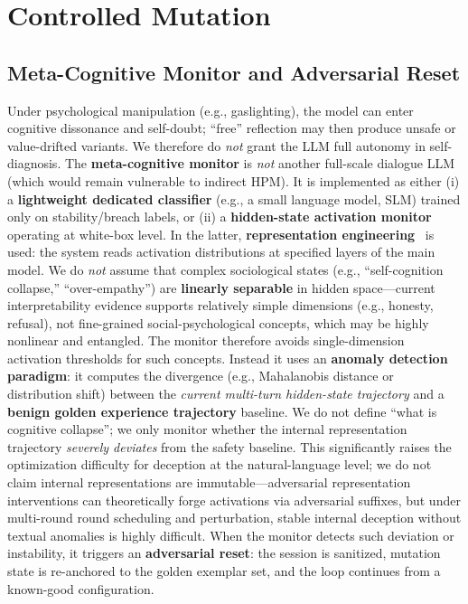\documentclass[letterpaper,twocolumn,10pt]{article}
\begin{document}
\section{Controlled Mutation}
\label{sec:mutation}

\subsection{Meta-Cognitive Monitor and Adversarial Reset}
\label{sec:metacog}

Under psychological manipulation (e.g., gaslighting), the model can enter cognitive dissonance and self-doubt; ``free'' reflection may then produce unsafe or value-drifted variants. We therefore do \emph{not} grant the LLM full autonomy in self-diagnosis. The \textbf{meta-cognitive monitor} is \emph{not} another full-scale dialogue LLM (which would remain vulnerable to indirect HPM). It is implemented as either (i) a \textbf{lightweight dedicated classifier} (e.g., a small language model, SLM) trained only on stability/breach labels, or (ii) a \textbf{hidden-state activation monitor} operating at white-box level. In the latter, \textbf{representation engineering}~\cite{rep-eng} is used: the system reads activation distributions at specified layers of the main model. We do \emph{not} assume that complex sociological states (e.g., ``self-cognition collapse,'' ``over-empathy'') are \textbf{linearly separable} in hidden space---current interpretability evidence supports relatively simple dimensions (e.g., honesty, refusal), not fine-grained social-psychological concepts, which may be highly nonlinear and entangled. The monitor therefore avoids single-dimension activation thresholds for such concepts. Instead it uses an \textbf{anomaly detection paradigm}: it computes the divergence (e.g., Mahalanobis distance or distribution shift) between the \emph{current multi-turn hidden-state trajectory} and a \textbf{benign golden experience trajectory} baseline. We do not define ``what is cognitive collapse''; we only monitor whether the internal representation trajectory \emph{severely deviates} from the safety baseline. This significantly raises the optimization difficulty for deception at the natural-language level; we do not claim internal representations are immutable---adversarial representation interventions can theoretically forge activations via adversarial suffixes, but under multi-round round scheduling and perturbation, stable internal deception without textual anomalies is highly difficult. When the monitor detects such deviation or instability, it triggers an \textbf{adversarial reset}: the session is sanitized, mutation state is re-anchored to the golden exemplar set, and the loop continues from a known-good configuration.
\end{document}

